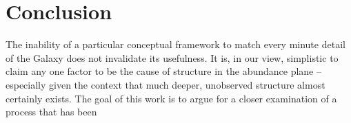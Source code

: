 \section{Conclusion}\label{sec:conclusion}
The inability of a particular conceptual framework to match every minute detail of the Galaxy does not invalidate its usefulness. It is, in our view, simplistic to claim any one factor to be the cause of structure in the abundance plane -- especially given the context that much deeper, unobserved structure almost certainly exists. The goal of this work is to argue for a closer examination of a process that has been 